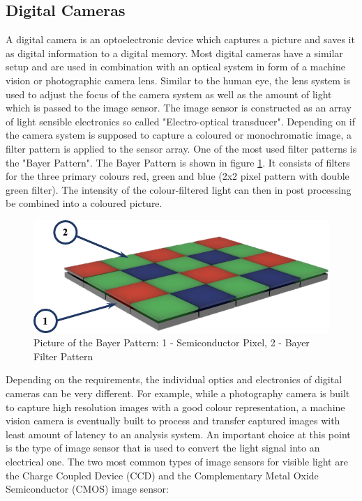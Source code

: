 \subsection{Digital Cameras}
A digital camera is an optoelectronic device which captures a picture and saves it as digital information to a digital memory. Most digital cameras have a similar setup and are used in combination with an optical system in form of a machine vision or photographic camera lens. Similar to the human eye, the lens system is used to adjust the focus of the camera system as well as the amount of light which is passed to the image sensor. The image sensor is constructed as an array of light sensible electronics so called "Electro-optical transducer". Depending on if the camera system is supposed to capture a coloured or monochromatic image, a filter pattern is applied to the sensor array. One of the most used filter patterns is the "Bayer Pattern". The Bayer Pattern is shown in figure \ref{BayerPattern}. It consists of filters for the three primary colours red, green and blue (2x2 pixel pattern with double green filter). The intensity of the colour-filtered light can then in post processing be combined into a coloured picture.\cite{LoefflerLang2020} 

\begin{figure}
\begin{center}
\includegraphics[width=12cm]{Pictures/BayerPattern}
\caption[Picture of the Bayer Pattern]{Picture of the Bayer Pattern: 1 - Semiconductor Pixel, 2 - Bayer Filter Pattern}
\label{BayerPattern}
\end{center}
\end{figure}

Depending on the requirements, the individual optics and electronics of digital cameras can be very different. For example, while a photography camera is built to capture high resolution images with a good colour representation, a machine vision camera is eventually built to process and transfer captured images with least amount of latency to an analysis system. An important choice at this point is the type of image sensor that is used to convert the light signal into an electrical one. The two most common types of image sensors for visible light are the Charge Coupled Device (CCD) and the Complementary Metal Oxide Semiconductor (CMOS) image sensor:

